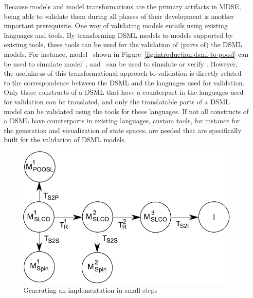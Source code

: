 
Because models and model transformations are the primary artifacts in MDSE, being able to validate them during all phases of their development is another important prerequisite.
One way of validating models entails using existing languages and tools.
By transforming DSML models to models supported by existing tools, these tools can be used for the validation of (parts of) the DSML models.
For instance, model~ shown in Figure~\ref{fig:introduction:dsml-to-poosl} can be used to simulate model~, and~ can be used to simulate or verify .
However, the usefulness of this transformational approach to validation is directly related to the correspondence between the DSML and the languages used for validation.
Only those constructs of a DSML that have a counterpart in the languages used for validation can be translated, and only the translatable parts of a DSML model can be validated using the tools for these languages.
If not all constructs of a DSML have counterparts in existing languages, custom tools, for instance for the generation and visualization of state spaces, are needed that are specifically built for the validation of DSML models.

\begin{figure}[hbt]
 \centering
 \includegraphics[scale=0.7]{introduction/figs/dsml-small-steps}
 \caption{Generating an implementation in small steps}
 \label{fig:introduction:small-steps}
\end{figure}


